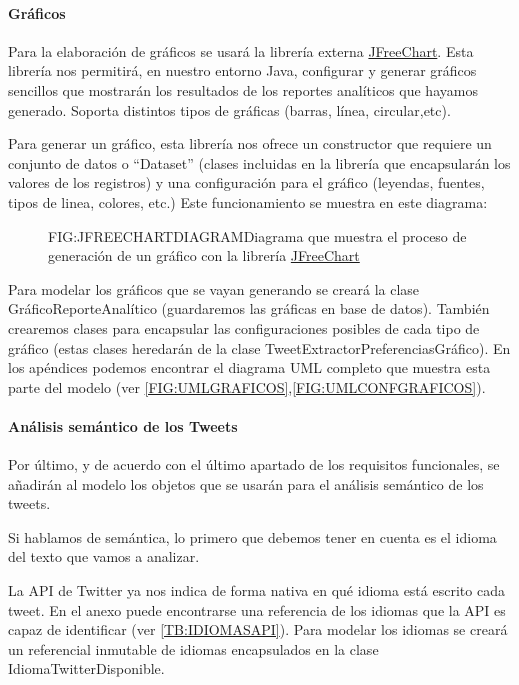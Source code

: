 \paragraph{Gráficos}
Para la elaboración de gráficos se usará la librería externa  \href{http://www.jfree.org/jfreechart/}{JFreeChart}. Esta librería nos permitirá, en nuestro entorno Java, configurar y generar gráficos sencillos que mostrarán los resultados de los reportes analíticos que hayamos generado. Soporta distintos tipos de gráficas (barras, línea, circular,etc).

Para generar un gráfico, esta librería nos ofrece un constructor que requiere un conjunto de datos o ``Dataset'' (clases incluidas en la librería que encapsularán los valores de los registros) y una configuración para el gráfico (leyendas, fuentes, tipos de linea, colores, etc.) Este funcionamiento se muestra en este diagrama:

\begin{figure}[Funcionamiento general de JFreeChart]{FIG:JFREECHARTDIAGRAM}{Diagrama que muestra el proceso de generación de un gráfico con la librería \href{http://www.jfree.org/jfreechart/}{JFreeChart}}
\end{figure}

Para modelar los gráficos que se vayan generando se creará la clase GráficoReporteAnalítico (guardaremos las gráficas en base de datos). También crearemos clases para encapsular las configuraciones posibles de cada tipo de gráfico (estas clases heredarán de la clase TweetExtractorPreferenciasGráfico). En los apéndices podemos encontrar el diagrama UML completo que muestra esta parte del modelo (ver \ref{FIG:UMLGRAFICOS},\ref{FIG:UMLCONFGRAFICOS}).


\paragraph{Análisis semántico de los Tweets}
Por último, y de acuerdo con el último apartado de los requisitos funcionales, se añadirán al modelo los objetos que se usarán para el análisis semántico de los tweets. 

Si hablamos de semántica, lo primero que debemos tener en cuenta es el idioma del texto que vamos a analizar. 

La API de Twitter ya nos indica de forma nativa en qué idioma está escrito cada tweet. En el anexo puede encontrarse una referencia de los idiomas que la API es capaz de identificar (ver \ref{TB:IDIOMASAPI}). Para modelar los idiomas se creará un referencial inmutable de idiomas encapsulados en la clase IdiomaTwitterDisponible.

